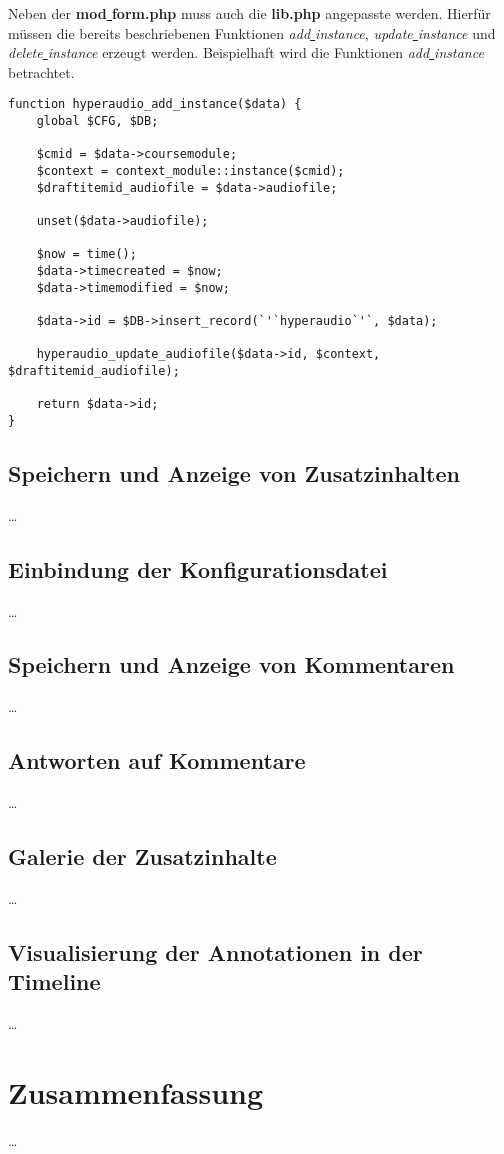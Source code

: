Neben der \textbf{mod\underline{{ }}form.php} muss auch die \textbf{lib.php} angepasste werden. Hierfür müssen die bereits beschriebenen Funktionen \textit{add\underline{{ }}instance}, \textit{update\underline{{ }}instance} und \textit{delete\underline{{ }}instance} erzeugt werden. Beispielhaft wird die Funktionen \textit{add\underline{{ }}instance} betrachtet. 

\begin{lstlisting}[basicstyle=\small,
             inputencoding={utf8}, 
             extendedchars=false,
             commentstyle=\color{black}, 
             keywordstyle=\color{black}, 
             escapeinside=``,
             linewidth=\textwidth,
             caption={Ausschnitt der \textbf{lib.php} in der 1. Iteration},
             label={lst:it1:lib}]
function hyperaudio_add_instance($data) {
    global $CFG, $DB;
    
    $cmid = $data->coursemodule;
    $context = context_module::instance($cmid);
    $draftitemid_audiofile = $data->audiofile;
    
    unset($data->audiofile);
     
    $now = time();
    $data->timecreated = $now;
    $data->timemodified = $now;
    
    $data->id = $DB->insert_record(`'`hyperaudio`'`, $data);
    
    hyperaudio_update_audiofile($data->id, $context, $draftitemid_audiofile);
     
    return $data->id;
}
\end{lstlisting}



\subsection{Speichern und Anzeige von Zusatzinhalten}
\dots

\subsection{Einbindung der Konfigurationsdatei}
\dots

\subsection{Speichern und Anzeige von Kommentaren}
\dots

\subsection{Antworten auf Kommentare}
\dots

\subsection{Galerie der Zusatzinhalte}
\dots

\subsection{Visualisierung der Annotationen in der Timeline}
\dots

\section{Zusammenfassung}
\dots